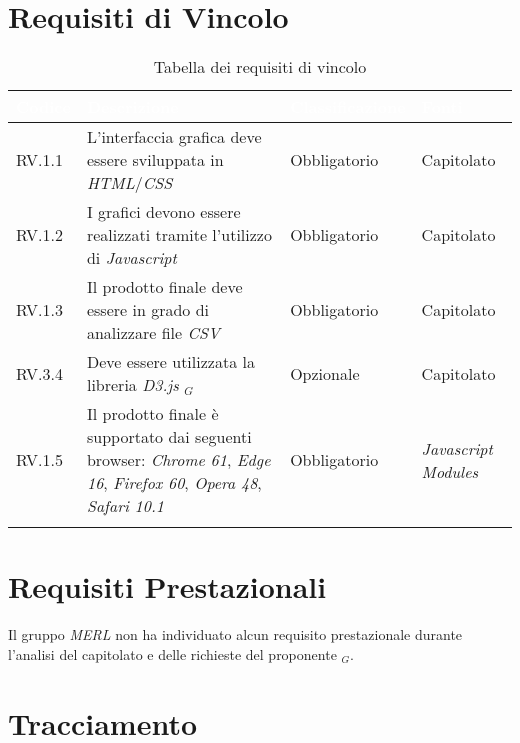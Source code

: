 \section{Requisiti di Vincolo}
\begin{center}
  \centering
  \begin{longtable}{|L{1,5cm}|C{5,5cm}|C{3cm}|C{2cm}|}
    \hline
    \textcolor[HTML]{FFFFFF}{\textbf{Codice}} & \textcolor[HTML]{FFFFFF}{\textbf{Descrizione}} & \textcolor[HTML]{FFFFFF}{\textbf{Classificazione}} & \textcolor[HTML]{FFFFFF}{\textbf{Fonti}}
    \\ \hline
    RV.1.1 & L'interfaccia grafica deve essere sviluppata in \textit{HTML}/\textit{CSS} & Obbligatorio & Capitolato \\ \hline
    RV.1.2 & I grafici devono essere realizzati tramite l'utilizzo di \textit{Javascript} & Obbligatorio & Capitolato \\ \hline
    RV.1.3 & Il prodotto finale deve essere in grado di analizzare file \textit{CSV} & Obbligatorio & Capitolato \\ \hline
    RV.3.4 & Deve essere utilizzata la libreria \textit{D3.js} $_G$ & Opzionale & Capitolato \\ \hline
    RV.1.5 & Il prodotto finale è supportato dai seguenti browser: \textit{Chrome 61}, \textit{Edge 16}, \textit{Firefox 60}, \textit{Opera 48}, \textit{Safari 10.1} & Obbligatorio & \textit{Javascript Modules} \\ \hline


    \caption{Tabella dei requisiti di vincolo}
  \end{longtable}
\end{center}

\section{Requisiti Prestazionali}
Il gruppo \textit{MERL} non ha individuato alcun requisito prestazionale durante l'analisi del capitolato e delle richieste del proponente $_G$.


\section{Tracciamento}

